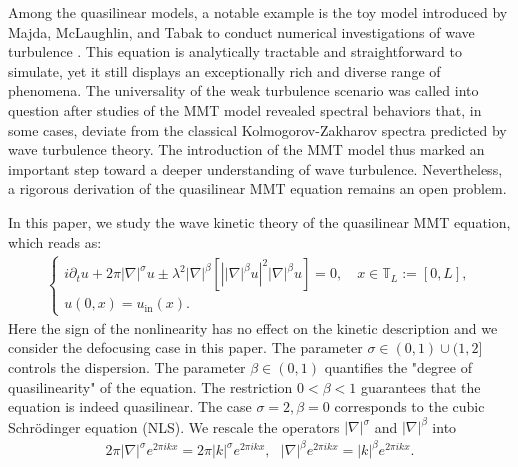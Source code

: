 \documentclass[UTF-8,reqno]{amsart}
\numberwithin{equation}{section}
\theoremstyle{definition}
\begin{document}
Among the quasilinear models, a notable example is the toy model introduced by Majda, McLaughlin, and Tabak to conduct  numerical investigations of wave turbulence \cite{MMT97}. This equation is analytically tractable and straightforward to simulate, yet it still displays an exceptionally rich and diverse range of phenomena.
The universality of the weak turbulence scenario was called into question after studies of the MMT model revealed spectral behaviors that, in some cases, deviate from the classical Kolmogorov-Zakharov spectra predicted by wave turbulence theory. The introduction of the MMT model thus marked an important step toward a deeper understanding of wave turbulence. Nevertheless, a rigorous derivation of the quasilinear MMT equation remains an open problem.  

In this paper, we study the wave kinetic theory of the quasilinear MMT equation, which reads as:
  \begin{align*}
 \tag{MMT} \label{MMT}
\begin{cases}
i \partial_t u +2\pi|\nabla|^\sigma u \pm \lambda^{2}|\nabla|^\beta\left[ \left||\nabla|^\beta u\right|^{2} |\nabla|^\beta u\right]=0,  \quad x\in \mathbb{T}_L := [0,L],   \\
u(0,x) = u_{\textrm{in}}(x).
\end{cases}
\end{align*}
Here the sign of the nonlinearity has no effect on the kinetic description and we consider the defocusing case in this paper.
  The parameter $\sigma\in(0,1)\cup (1,2]$ controls the dispersion.  The parameter $\beta\in(0,1)$ quantifies the "degree of quasilinearity" of the equation. The restriction $0<\beta<1$ guarantees that the equation is indeed quasilinear. The case $\sigma=2,\beta=0$ corresponds to the cubic  Schr\"odinger equation (NLS).
 We rescale   the operators     $|\nabla|^\sigma$ and $|\nabla|^\beta$   into
\begin{align*} 2\pi|\nabla|^\sigma e^{ 2\pi ikx} =2\pi |k|^\sigma  e^{2\pi ik x},\ \ \
 |\nabla|^\beta e^{2\pi ikx} = |k|^\beta  e^{2\pi ik x}.
\end{align*} 
\end{document}
